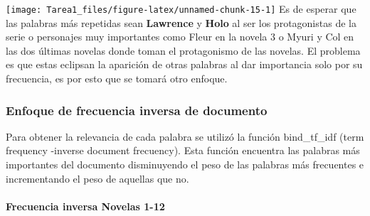 \documentclass[
]{article}
\begin{document}
\texttt{[image: Tarea1\_files/figure-latex/unnamed-chunk-15-1]}
Es de esperar que las palabras más repetidas sean \textbf{Lawrence} y
\textbf{Holo} al ser los protagonistas de la serie o personajes muy
importantes como Fleur en la novela 3 o Myuri y Col en las dos últimas
novelas donde toman el protagonismo de las novelas. El problema es que
estas eclipsan la aparición de otras palabras al dar importancia solo
por su frecuencia, es por esto que se tomará otro enfoque.

\hypertarget{enfoque-de-frecuencia-inversa-de-documento}{%
\subsubsection{\texorpdfstring{\textbf{Enfoque de frecuencia inversa de
documento}}{Enfoque de frecuencia inversa de documento}}\label{enfoque-de-frecuencia-inversa-de-documento}}

Para obtener la relevancia de cada palabra se utilizó la función
bind\_tf\_idf (term frequency -inverse document frecuency). Esta función
encuentra las palabras más importantes del documento disminuyendo el
peso de las palabras más frecuentes e incrementando el peso de aquellas
que no.

\hypertarget{frecuencia-inversa-novelas-1-12}{%
\paragraph{\texorpdfstring{\textbf{Frecuencia inversa Novelas
1-12}}{Frecuencia inversa Novelas 1-12}}\label{frecuencia-inversa-novelas-1-12}}
\end{document}
